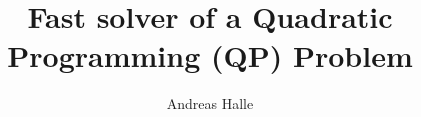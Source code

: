 \documentclass[a4paper]{report}
\begin{document}
\newcommand*\printpoint[2]{(%
\pgfmathparse{0.03514598035*#1}\pgfmathprintnumber{\pgfmathresult},%
\pgfmathparse{0.03514598035*#2}\pgfmathprintnumber{\pgfmathresult})%
}

\title{Fast solver of a Quadratic Programming (QP) Problem}
\author{Andreas Halle}

\maketitle

\tableofcontents
\listoffigures
\listoftables










{}

\end{document}

